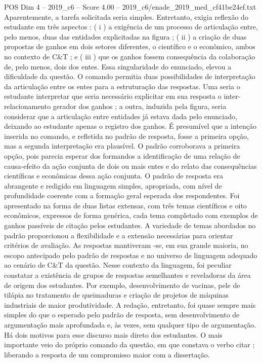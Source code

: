 \begin{textsample}{POS Dim 4 – 2019\_c6 – Score 4.00 – 2019\_c6/enade\_2019\_med\_cf41be24ef.txt}
Aparentemente, a tarefa solicitada seria simples.
Entretanto, exigia reflexão do estudante em três aspectos : ( i ) a exigência de um processo de articulação entre, pelo menos, duas das entidades explicitadas na figura ; ( ii ) a criação de duas propostas de ganhos em dois setores diferentes, o científico e o econômico, ambos no contexto de C\&T ; e ( iii ) que os ganhos fossem consequência da colaboração de, pelo menos, dois dos entes.
Essa singularidade do enunciado, elevou a dificuldade da questão.
O comando permitia duas possibilidades de interpretação da articulação entre os entes para a estruturação das respostas.
Uma seria o estudante interpretar que seria necessário explicitar em sua resposta o inter-relacionamento gerador dos ganhos ; a outra, induzida pela figura, seria considerar que a articulação entre entidades já estava dada pelo enunciado, deixando ao estudante apenas o registro dos ganhos.
É presumível que a intenção inserida no comando, e refletida no padrão de resposta, fosse a primeira opção, mas a segunda interpretação era plausível.
O padrão corroborava a primeira opção, pois parecia esperar dos formandos a identificação de uma relação de causa-efeito da ação conjunta de dois ou mais entes e do relato das consequências científicas e econômicas dessa ação conjunta.
O padrão de resposta era abrangente e redigido em linguagem simples, apropriada, com nível de profundidade coerente com a formação geral esperada dos respondentes.
Foi apresentado na forma de duas listas extensas, com três temas científicos e oito econômicos, expressos de forma genérica, cada tema completado com exemplos de ganhos passíveis de citação pelos estudantes.
A variedade de temas abordados no padrão proporcionou a flexibilidade e a extensão necessárias para orientar critérios de avaliação.
As respostas mantiveram -se, em sua grande maioria, no escopo antecipado pelo padrão de respostas e no universo de linguagem adequado ao cenário de C\&T da questão.
Nesse contexto da linguagem, foi peculiar constatar a existência de grupos de respostas semelhantes e reveladoras da área de origem dos estudantes.
Por exemplo, desenvolvimento de vacinas, pele de tilápia no tratamento de queimaduras e criação de projetos de máquinas industriais de maior produtividade.
A redação, entretanto, foi quase sempre mais simples do que o esperado pelo padrão de resposta, sem desenvolvimento de argumentação mais aprofundada e, às vezes, sem qualquer tipo de argumentação.
Há dois motivos para esse discurso mais direto dos estudantes.
O mais importante veio do próprio comando da questão, em que constava o verbo citar ; liberando a resposta de um compromisso maior com a dissertação.

\end{textsample}
